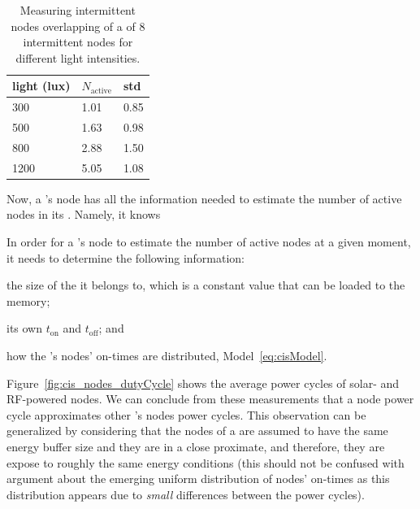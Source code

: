 \begin{table}
		\centering
		\caption{Measuring intermittent nodes overlapping of a \sys of 8 intermittent nodes for different light intensities.}
		\begin{tabular}{lll}
				\hline
				\textbf{light (lux)} & \textbf{$N_\text{active}$} & \textbf{std}   \\
				\hline
				300	                  & 1.01 & 0.85   \\
				500                   & 1.63 & 0.98   \\
				800                   & 2.88 & 1.50   \\
				1200                  & 5.05 & 1.08   \\
				\hline
		\end{tabular}
		\label{tab:clusters}
\end{table}

Now, a \sys's node has all the information needed to estimate the number of active nodes in its \sys. Namely, it knows

In order for a \sys's node to estimate the number of active nodes at a given moment, it needs to determine the following information: 
\begin{enumerate*}[label=(\roman*)]
 \item the size of the \sys it belongs to, which is a constant value that can be loaded to the memory; 
 \item its own $t_\text{on}$ and $t_\text{off}$; and 
 \item how the \sys's nodes' on-times are distributed, Model~\ref{eq:cisModel}.
\end{enumerate*}
Figure~\ref{fig:cis_nodes_dutyCycle} shows the average power cycles of solar- and RF-powered nodes.
We can conclude from these measurements that a node power cycle approximates other \sys's nodes power cycles.
This observation can be generalized by considering that the nodes of a \sys are assumed to have the same energy buffer size and they are in a close proximate, and therefore, they are expose to roughly the same energy conditions (this should not be confused with argument about the emerging uniform distribution of nodes' on-times as this distribution appears due to \emph{small} differences between the power cycles).  


